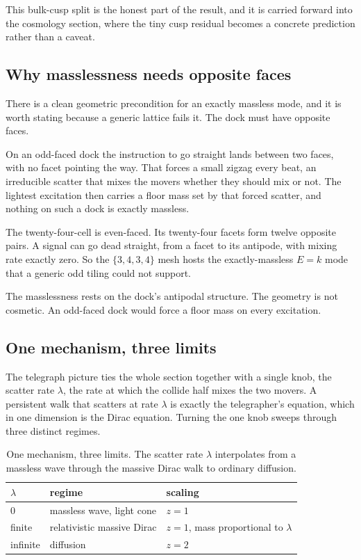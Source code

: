 This bulk-cusp split is the honest part of the result, and it is carried forward into the cosmology section, where
the tiny cusp residual becomes a concrete prediction rather than a caveat.

\subsection{Why masslessness needs opposite faces}

There is a clean geometric precondition for an exactly massless mode, and it is worth stating because a generic
lattice fails it. The dock must have opposite faces.

On an odd-faced dock the instruction to go straight lands between two faces, with no facet pointing the way. That
forces a small zigzag every beat, an irreducible scatter that mixes the movers whether they should mix or not. The
lightest excitation then carries a floor mass set by that forced scatter, and nothing on such a dock is exactly
massless.

The twenty-four-cell is even-faced. Its twenty-four facets form twelve opposite pairs. A signal can go dead
straight, from a facet to its antipode, with mixing rate exactly zero. So the $\{3,4,3,4\}$ mesh hosts the
exactly-massless $E = k$ mode that a generic odd tiling could not support.

\begin{principle}
The masslessness rests on the dock's antipodal structure. The geometry is not cosmetic. An odd-faced dock would
force a floor mass on every excitation.
\end{principle}

\subsection{One mechanism, three limits}

The telegraph picture ties the whole section together with a single knob, the scatter rate $\lambda$, the rate at
which the collide half mixes the two movers. A persistent walk that scatters at rate $\lambda$ is exactly the
telegrapher's equation, which in one dimension is the Dirac equation. Turning the one knob sweeps through three
distinct regimes.

\begin{table}[ht]
\centering
\begin{tabular}{@{}lll@{}}
\toprule
$\lambda$ & regime & scaling \\
\midrule
$0$ & massless wave, light cone & $z = 1$ \\
finite & relativistic massive Dirac & $z = 1$, mass proportional to $\lambda$ \\
infinite & diffusion & $z = 2$ \\
\bottomrule
\end{tabular}
\caption{One mechanism, three limits. The scatter rate $\lambda$ interpolates from a massless wave through the
massive Dirac walk to ordinary diffusion.}
\label{tab:telegraph}
\end{table}

